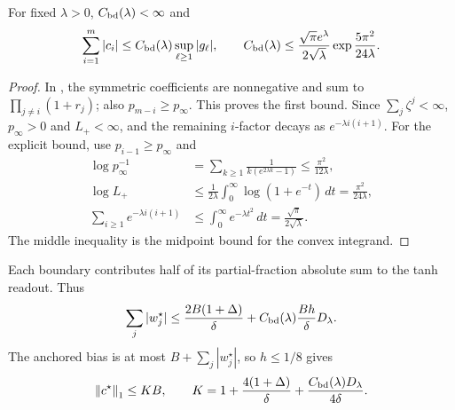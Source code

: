 \begin{proposition}
\label{prop:Cbd}
For fixed $\lambda>0$, $C_{\mathrm{bd}}(\lambda)<\infty$ and
\begin{equation}
 \sum_{i=1}^m|c_i|\le C_{\mathrm{bd}}(\lambda)\sup_{\ell\ge1}|g_\ell|,
 \qquad
 C_{\mathrm{bd}}(\lambda)\le\frac{\sqrt\pi e^\lambda}{2\sqrt\lambda}
                  \exp\frac{5\pi^2}{24\lambda}.
 \label{eq:Cbd-bound}
\end{equation}
\end{proposition}
\begin{proof}
In , the symmetric coefficients are nonnegative and
sum to $\prod_{j\ne i}(1+r_j)$; also $p_{m-i}\ge p_\infty$.
This proves the first bound. Since $\sum_j\zeta^j<\infty$, $p_\infty>0$
and $L_+<\infty$, and the remaining $i$-factor decays as
$e^{-\lambda i(i+1)}$. For the explicit bound, use $p_{i-1}\ge p_\infty$ and
\begin{align*}
 \log p_\infty^{-1}
 &=\sum_{k\ge1}\frac1{k(e^{2\lambda k}-1)}\le\frac{\pi^2}{12\lambda},\\
 \log L_+&\le\frac1{2\lambda}\int_0^\infty\log(1+e^{-t})\,dt
          =\frac{\pi^2}{24\lambda},\\
 \sum_{i\ge1}e^{-\lambda i(i+1)}
 &\le\int_0^\infty e^{-\lambda t^2}\,dt=\frac{\sqrt\pi}{2\sqrt\lambda}.
\end{align*}
The middle inequality is the midpoint bound for the convex integrand.
\end{proof}
Each boundary contributes half of its partial-fraction absolute sum to the
tanh readout. Thus
\begin{equation}
 \sum_j|w_j^\star|\le\frac{2B(1+\Delta)}\delta+
                 C_{\mathrm{bd}}(\lambda)\frac{Bh}\delta D_\lambda.
 \label{eq:weight-sum}
\end{equation}
The anchored bias is at most $B+\sum_j|w_j^\star|$, so $h\le1/8$ gives
\begin{equation}
 \left\lVert c^\star\right\rVert_1\le K B,\qquad
 K=1+\frac{4(1+\Delta)}\delta+\frac{C_{\mathrm{bd}}(\lambda)D_\lambda}{4\delta}.
 \label{eq:K}
\end{equation}

